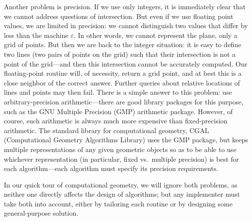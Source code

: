 \documentclass[11pt]{article}
\begin{document}
Another problem is precision.  If we use only integers, it is immediately clear
that we cannot address questions of intersection.  But even if we use floating
point values, we are limited in precision: we cannot distinguish two values
that differ by less than the machine $\varepsilon$.  In other words, we cannot
represent the plane, only a grid of points.  But then we are back to the
integer situation: it is easy to define two lines (two pairs of points
on the grid) such that their intersection is not a point of the grid---and
then this intersection cannot be accurately computed. Our floating-point
routine will, of necessity, return a grid point, and at best this is a close
neighbor of the correct answer.  Further queries about relative locations of
lines and points may then fail.   There is a simple answer to this problem:
use arbitrary-precision arithmetic---there are good library packages for this
purpose, such as the GNU Multiple Precision (GMP) arithmetic package.
However, of course, such arithmetic is always much more expensive than
fixed-precision arithmetic.  The standard library for computational geometry,
CGAL (Computational Geometry Algorithms Library) uses the GMP package, but
keeps multiple representations of any given geometric objects so as to be
able to use whichever representation (in particular, fixed vs.\ multiple
precision) is best for each algorithm---each algorithm must specify its
precision requirements.

In our quick tour of computational geometry, we will ignore both problems,
as neither one directly affects the design of algorithms; but any implementer
must take both into account, either by tailoring each routine or by designing
some general-purpose solution.
\end{document}
